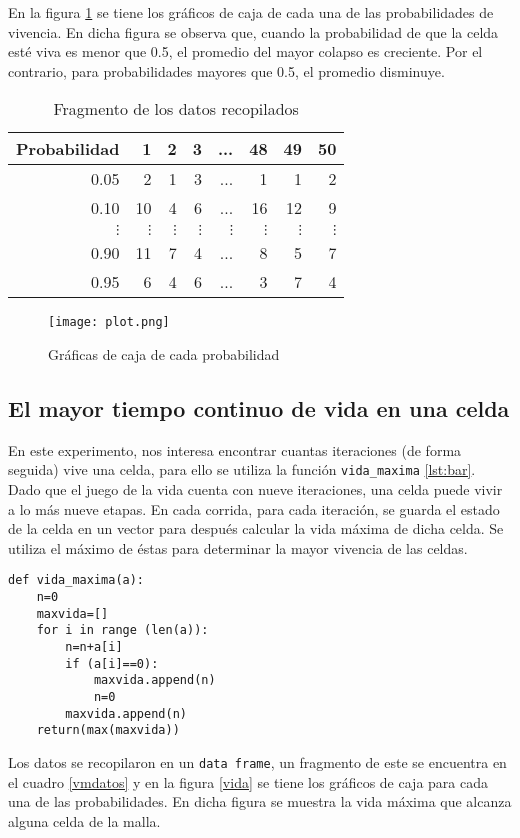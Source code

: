 \documentclass[12pt,letterpaper]{article}
\begin{document}
En la figura \ref{colapso} se tiene los gráficos de caja de cada una de las probabilidades de vivencia. En dicha figura se observa que, cuando la probabilidad de que la celda esté viva es menor que 0.5, el promedio del mayor colapso es creciente. Por el contrario, para probabilidades mayores que 0.5, el promedio disminuye.
\begin{table}
\centering
\caption{Fragmento de los datos recopilados}
\begin{tabular}{rrrrrrrr}
\hline 
Probabilidad & 1 & 2 & 3 & ... & 48 & 49 & 50 \\ 
\hline 
0.05 & 2 & 1 & 3 & ... & 1 & 1 & 2 \\ 
0.10 & 10 & 4 & 6 & ... & 16 & 12 & 9 \\ 
$\vdots$ & $\vdots$ & $\vdots$ & $\vdots$ & $\vdots$ & $\vdots$ & $\vdots$ & $\vdots$ \\ 
0.90 & 11 & 7 & 4 & ... & 8 & 5 & 7 \\ 
 0.95 & 6 & 4 & 6 & ... & 3 & 7 & 4 \\  
 \hline
\end{tabular} 
\label{mcdatos}
\end{table}



\begin{figure}
\centering
 \texttt{[image: plot.png]}
 \caption{Gráficas de caja de cada probabilidad}
 \label{colapso}
\end{figure}

\subsection{El mayor tiempo continuo de vida en una celda}
En este experimento, nos interesa encontrar cuantas iteraciones (de forma seguida) vive una celda, para ello se utiliza la función \texttt{vida\_maxima} \ref{lst:bar}. Dado que el juego de la vida cuenta con nueve iteraciones, una celda puede vivir a lo más nueve etapas. En cada corrida, para cada iteración, se guarda el estado de la celda en un vector para después calcular la vida máxima de dicha celda. Se utiliza el máximo de éstas para determinar la mayor vivencia de las celdas.

\begin{lstlisting}[label=lst:bar,caption=Función de vida máxima., frame = single, framexleftmargin=15pt]
def vida_maxima(a):
    n=0
    maxvida=[]
    for i in range (len(a)):
        n=n+a[i]
        if (a[i]==0):
            maxvida.append(n)
            n=0
        maxvida.append(n)
    return(max(maxvida))
\end{lstlisting} 
Los datos se recopilaron en un \texttt{data frame}, un fragmento de este se encuentra en el cuadro \ref{vmdatos} y
en la figura \ref{vida} se tiene los gráficos de caja para cada una de las probabilidades. En dicha figura se muestra la vida máxima que alcanza alguna celda de la malla. 
\end{document}
